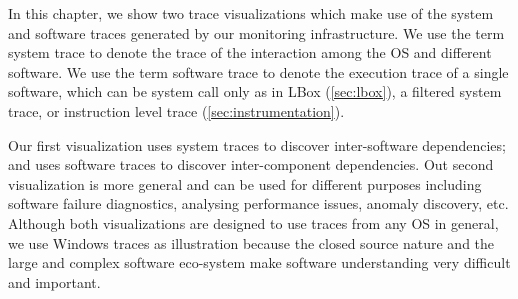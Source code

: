 
In this chapter, we show two trace visualizations which make use
of the system and software traces generated by our monitoring infrastructure.
We use the term system trace to denote the trace of the interaction
among the OS and different software.
We use the term software trace to denote the execution trace of a single
software, which can be system call only as in LBox (\ref{sec:lbox}),
a filtered system trace, or
instruction level trace (\ref{sec:instrumentation}).

Our first visualization uses system traces to discover inter-software
dependencies; and uses software traces to
discover inter-component dependencies.
Out second visualization is more general and can be used for different
purposes including software failure diagnostics, analysing performance
issues, anomaly discovery, etc.
Although both visualizations are designed to use traces from any OS in general,
we use Windows traces as illustration because
the closed source nature and the large and complex software eco-system make
software understanding very difficult and important.
